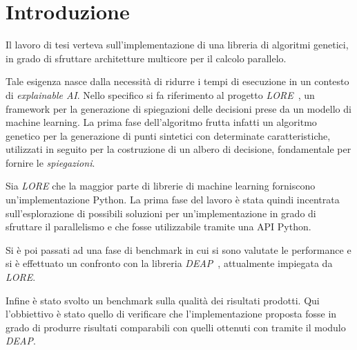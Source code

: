 \chapter*{Introduzione}

Il lavoro di tesi verteva sull'implementazione di una libreria di algoritmi
genetici, in grado di sfruttare architetture multicore per il calcolo parallelo.

Tale esigenza nasce dalla necessità di ridurre i tempi di esecuzione in un
contesto di \textit{explainable AI}. Nello specifico si fa riferimento al
progetto \textit{LORE}~\cite{guidotti2018lore}, un framework per la generazione
di spiegazioni delle decisioni prese da un modello di machine learning. La prima
fase dell'algoritmo frutta infatti un algoritmo genetico per la generazione di
punti sintetici con determinate caratteristiche, utilizzati in seguito per la
costruzione di un albero di decisione, fondamentale per fornire le
\textit{spiegazioni}.

Sia \textit{LORE} che la maggior parte di librerie di machine learning
forniscono un'implementazione Python. La prima fase del lavoro è stata quindi
incentrata sull'esplorazione di possibili soluzioni per un'implementazione in
grado di sfruttare il parallelismo e che fosse utilizzabile tramite una API
Python.

Si è poi passati ad una fase di benchmark in cui si sono valutate le
performance e si è effettuato un confronto con la libreria
\textit{DEAP}~\cite{DEAP_JMLR2012}, attualmente impiegata da \textit{LORE}.

Infine è stato svolto un benchmark sulla qualità dei risultati prodotti. Qui
l'obbiettivo è stato quello di verificare che l'implementazione proposta fosse
in grado di produrre risultati comparabili con quelli ottenuti con tramite
il modulo \textit{DEAP}.